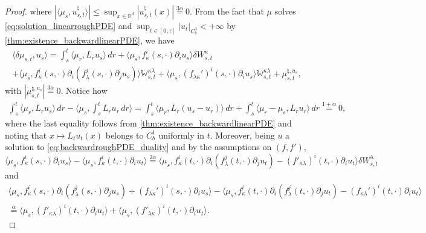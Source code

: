 \documentclass[10pt, a4paper]{article} %
\newcommand{\R}{\mathbb{R}}
\theoremstyle{definition}
\theoremstyle{plain}
\begin{document}
\begin{proof}
    where $|\langle \mu_s, u^\natural_{s,t} \rangle| \le \sup_{x \in \R^d} |u_{s,t}^\natural(x)| \overset{3\alpha}{=} 0$. 
    From the fact that $\mu$ solves \eqref{eq:solution_linearroughPDE} and $\sup_{t \in [0,\tau]} |u_t|_{C^3_b} < +\infty$ by \cref{thm:existence_backwardlinearPDE}, we have
    \begin{multline*}
        \langle \delta \mu_{s,t}, u_s \rangle = \int_s^t \langle \mu_r , L_r u_s \rangle \, dr + \langle \mu_s, f^i_\kappa (s,\cdot) \partial_i u_s \rangle \delta W^\kappa_{s,t}  \\ + \langle \mu_s , f_\kappa^i (s,\cdot) \partial_i( f^j_\lambda (s,\cdot) \partial_ju_s) \rangle \mathbb{W}^{\kappa\lambda}_{s,t} +  \langle \mu_s, (f_{\lambda\kappa}')^i (s,\cdot) \partial_i u_s \rangle \mathbb{W}_{s,t}^{\kappa\lambda} + \mu_{s,t}^{\natural,u_s} ,
    \end{multline*}
    with $|\mu_{s,t}^{\natural,u_s} | \overset{3\alpha}{=} 0$. 
    Notice how \begin{multline*}
        \int_s^t \langle \mu_r, L_r u_s \rangle \, dr - \langle \mu_s , \int_s^t  L_r u_r \, dr \rangle = \int_s^t \langle \mu_r, L_r (u_s-u_r) \rangle \, dr + \int_s^t \langle \mu_r - \mu_s ,   L_r u_r  \rangle \, dr \overset{1+\alpha}{=} 0,  
    \end{multline*}
    where the last equality follows from \cref{thm:existence_backwardlinearPDE} and noting that $x \mapsto L_t u_t(x)$ belongs to $C^1_b$ uniformly in $t$. 
    Moreover, being $u$ a solution to \eqref{eq:backwardroughPDE_duality} and by the assumptions on $(f,f')$, \begin{equation*}
        \langle \mu_s, f^i_\kappa (s,\cdot) \partial_i u_s  \rangle - \langle \mu_s, f^i_\kappa (t,\cdot) \partial_i u_t  \rangle \overset{2\alpha}{=} \langle \mu_s, f^i_\kappa (t,\cdot) \partial_i( f_\lambda^j(t,\cdot) \partial_j u_t) - (f'_{\kappa\lambda})^i(t,\cdot) \partial_i u_t \rangle \delta W^\lambda_{s,t}
    \end{equation*} and \begin{multline*}
        \langle \mu_s , f_\kappa^i (s,\cdot) \partial_i( f^j_\lambda (s,\cdot) \partial_ju_s) +(f_{\lambda\kappa}')^i (s,\cdot) \partial_i u_s \rangle -  \langle \mu_s, f^i_\kappa(t,\cdot) \partial_i(f^j_\lambda(t,\cdot) \partial_j u_t) - (f_{\kappa\lambda}')^i(t,\cdot) \partial_i u_t \rangle  \\ \overset{\alpha}{=} \langle \mu_s , (f'_{\kappa \lambda})^i (t,\cdot) \partial_i u_t \rangle +  \langle \mu_s , (f'_{\lambda \kappa})^i (t,\cdot) \partial_i u_t \rangle. 

\end{multline*}
\end{proof}
\end{document}
